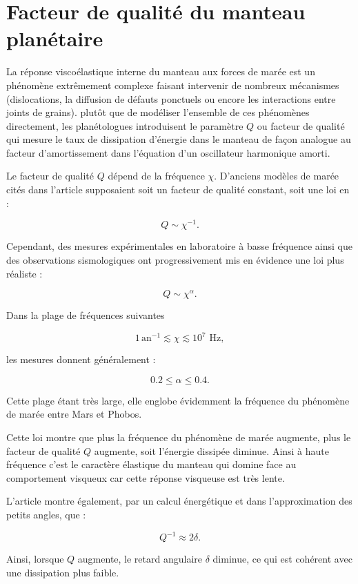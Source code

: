 \documentclass[12pt,a4paper]{article}
\begin{document}
	\section{Facteur de qualité du manteau planétaire}
	
	La réponse viscoélastique interne du manteau aux forces de marée est un phénomène extrêmement complexe faisant intervenir de nombreux mécanismes (dislocations, la diffusion de défauts ponctuels ou encore les interactions entre joints de grains). plutôt que de modéliser l'ensemble de ces phénomènes directement, les planétologues introduisent le paramètre $Q$ ou facteur de qualité qui mesure le taux de dissipation d'énergie dans le manteau de façon analogue au facteur d'amortissement dans l'équation d'un oscillateur harmonique amorti. 
	
	Le facteur de qualité $Q$ dépend de la fréquence $\chi$. D’anciens modèles de marée cités dans l'article supposaient soit un facteur de qualité constant, soit une loi en :
	
	\[
	Q \sim \chi^{-1}.
	\]
	
	Cependant, des mesures expérimentales en laboratoire à basse fréquence ainsi que des observations sismologiques ont progressivement mis en évidence une loi plus réaliste :
	
	\[
	Q \sim \chi^\alpha.
	\]
	
	Dans la plage de fréquences suivantes 
	
	\[
	1\,\text{an}^{-1} \lesssim \chi \lesssim 10^7 \text{ Hz},
	\]
	
	les mesures donnent généralement :
	
	\[
	0.2 \leq \alpha \leq 0.4.
	\]
	
	Cette plage étant très large, elle englobe évidemment la fréquence du phénomène de marée entre Mars et Phobos. 
	
	Cette loi montre que plus la fréquence du phénomène de marée augmente, plus le facteur de qualité $Q$ augmente, soit l'énergie dissipée diminue. Ainsi à haute fréquence c'est le caractère élastique du manteau qui domine face au comportement visqueux car cette réponse visqueuse est très lente.
	
	L’article montre également, par un calcul énergétique et dans l’approximation des petits angles, que :
	
	\[
	Q^{-1}\approx 2\delta.
	\]
	
	Ainsi, lorsque $Q$ augmente, le retard angulaire $\delta$ diminue, ce qui est cohérent avec une dissipation plus faible.
	
\end{document}
